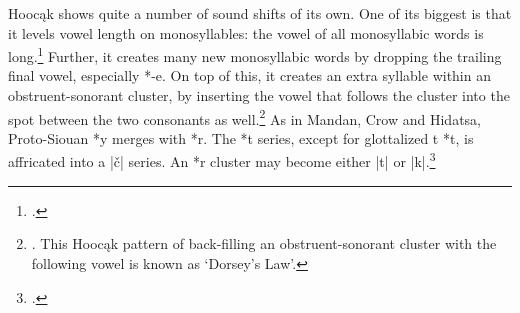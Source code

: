 \documentclass[output=paper]{LSP/langsci}
\begin{document}
Hooc\k{a}k shows quite a number of sound shifts of its own.  One of its biggest is that it levels vowel length on monosyllables: the vowel of all monosyllabic words is long.\footnote{\citealt[303, 797]{Rankinetal2006PDF}.} Further, it creates many new monosyllabic words by dropping the trailing final vowel, especially *-e.  On top of this, it creates an extra syllable within an obstruent-sonorant cluster, by inserting the vowel that follows the cluster into the spot between the two consonants as well.\footnote{\citet[123--124]{Helmbrecht2011}. This Hooc\k{a}k pattern of back-filling an obstruent-sonorant cluster with the following vowel is known as `Dorsey's Law'.}  As in Mandan, Crow and Hidatsa, Proto-Siouan *y merges with *r.  The *t series, except for glottalized t *t\textsuperscript{}, is affricated into a |\v{c}| series.  An *r\textsuperscript{} cluster may become either |t\textsuperscript{}| or |k\textsuperscript{}|.\footnote{\citealt[816-817]{Rankinetal2006PDF}.}
\end{document}
